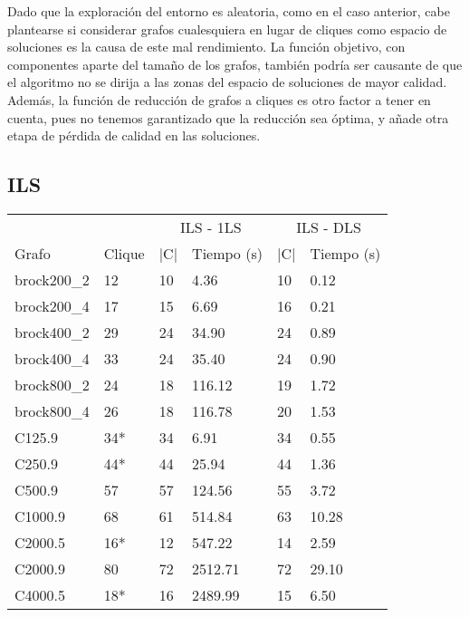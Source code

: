 Dado que la exploración del entorno es aleatoria, como en el caso anterior, cabe
plantearse si considerar grafos cualesquiera en lugar de cliques como espacio de
soluciones es la causa de este mal rendimiento. La función objetivo, con componentes
aparte del tamaño de los grafos, también podría ser causante de que el algoritmo
no se dirija a las zonas del espacio de soluciones de mayor calidad. Además, la
función de reducción  de grafos a cliques es otro factor a tener en cuenta, pues
no tenemos garantizado que la reducción sea óptima, y añade otra etapa de pérdida
de calidad en las soluciones.

\subsection{ILS}

\begin{small}
\begin{longtable}{l l l l l l}
  \label{table:ils}\\
    & & \multicolumn{2}{c}{ILS - 1LS} & \multicolumn{2}{c}{ILS - DLS} \\ \cline{3-6}
    Grafo              & Clique & |C| & Tiempo (s) & |C| & Tiempo (s) \\ \hline
    \endhead
    \endfoot
    brock200\_2        & 12 & 10 & 4.36 & 10 & 0.12\\ \hline
    brock200\_4        & 17 & 15 & 6.69 & 16 & 0.21\\ \hline
    brock400\_2        & 29 & 24 & 34.90 & 24 & 0.89\\ \hline
    brock400\_4        & 33 & 24 & 35.40 & 24 & 0.90\\ \hline
    brock800\_2        & 24 & 18 & 116.12 & 19 & 1.72\\ \hline
    brock800\_4        & 26 & 18 & 116.78 & 20 & 1.53\\ \hline
    C125.9             & 34* & 34 & 6.91 & 34 & 0.55\\ \hline
    C250.9             & 44* & 44 & 25.94 & 44 & 1.36\\ \hline
    C500.9             & 57 & 57 & 124.56 & 55 & 3.72\\ \hline
    C1000.9            & 68 & 61 & 514.84 & 63 & 10.28\\ \hline
    C2000.5            & 16* & 12 & 547.22 & 14 & 2.59\\ \hline
    C2000.9            & 80 & 72 & 2512.71 & 72 & 29.10\\ \hline
    C4000.5            & 18* & 16 & 2489.99 & 15 & 6.50\\ \hline

\end{longtable}
\end{small}
